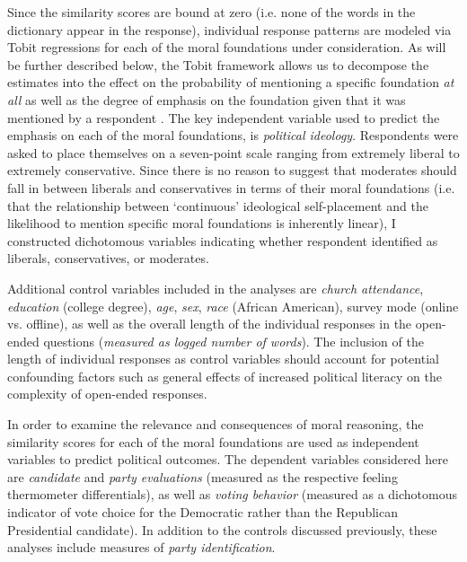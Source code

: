 \documentclass[12pt]{article}
\begin{document}
Since the similarity scores are bound at zero (i.e. none of the words in the dictionary appear in the response), individual response patterns are modeled via Tobit regressions for each of the moral foundations under consideration. As will be further described below, the Tobit framework allows us to decompose the estimates into the effect on the probability of mentioning a specific foundation \textit{at all} as well as the degree of emphasis on the foundation given that it was mentioned by a respondent \citep[see][for details on the decomposition of Tobit model estimates]{mcdonald1980uses}. The key independent variable used to predict the emphasis on each of the moral foundations, is \textit{political ideology}. Respondents were asked to place themselves on a seven-point scale ranging from extremely liberal to extremely conservative. Since there is no reason to suggest that moderates should fall in between liberals and conservatives in terms of their moral foundations (i.e. that the relationship between `continuous' ideological self-placement and the likelihood to mention specific moral foundations is inherently linear), I constructed dichotomous variables indicating whether respondent identified as liberals, conservatives, or moderates.

Additional control variables included in the analyses are \textit{church attendance}, \textit{education} (college degree), \textit{age}, \textit{sex}, \textit{race} (African American), survey mode (online vs. offline), as well as the overall length of the individual responses in the open-ended questions (\textit{measured as logged number of words}). The inclusion of the length of individual responses as control variables should account for potential confounding factors such as general effects of increased political literacy on the complexity of open-ended responses.

In order to examine the relevance and consequences of moral reasoning, the similarity scores for each of the moral foundations are used as independent variables to predict political outcomes. The dependent variables considered here are \textit{candidate} and \textit{party evaluations} (measured as the respective feeling thermometer differentials), as well as \textit{voting behavior} (measured as a dichotomous indicator of vote choice for the Democratic rather than the Republican Presidential candidate). In addition to the controls discussed previously, these analyses include measures of \textit{party identification}.
\end{document}
